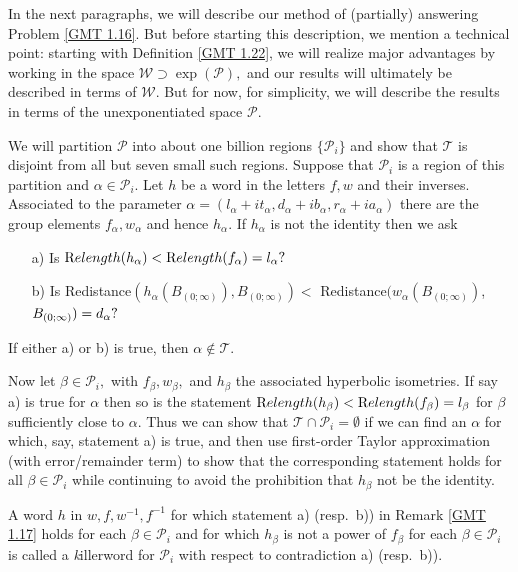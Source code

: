 \begin{remark}\label{GMT 1.17}
	In the next     paragraphs, we will describe our method of (partially) answering Problem \ref{GMT 1.16}.  But before starting this description, we
	mention a technical point: starting with Definition \ref{GMT 1.22}, we 
will realize major advantages by working in the space $\mathcal {W} \supset \exp(\mathcal {P}),$ and
our results will ultimately be described in terms of $\mathcal {W}.$ But for now, for simplicity,  we will describe the results in terms of the unexponentiated space $\mathcal {P}.$

We will partition $\mathcal {P}$ into about one billion regions
$\{ \mathcal {P}_i\}$ and show that $\mathcal {T}$ is disjoint from all but seven small such regions.   Suppose that
$\mathcal {P}_i$ is a region of this partition and $\alpha\in \mathcal {P}_i.$  Let $h$ be a word in the
letters $f,w$ and their inverses.  Associated to the parameter
$\alpha=(l_\alpha+it_\alpha, d_\alpha+ib_\alpha, r_\alpha
+ia_\alpha)$ there are the group elements
$f_\alpha, w_\alpha$ and hence $h_\alpha.$ 
If $h_\alpha$ is not the identity then we ask
\begin{itemize}
\item[a)]  Is ${\textrm Relength} (h_\alpha) < {\textrm Relength}(f_\alpha) = l_\alpha?$

\item[b)]  Is Redistance$(h_\alpha(B_{(0;\infty)}), B_{(0;\infty)}) < $ Redistance$(w_\alpha(B_{(0;\infty)})$, $B_{(0;\infty)})\break = d_\alpha?$
\end{itemize}
\noindent If either a) or b) is true, then $\alpha\notin \mathcal {T}.$

Now let $\beta\in \mathcal {P}_i,$
with $f_\beta, w_\beta,$ and $h_\beta$ the associated hyperbolic isometries.  If
say a) is true for $\alpha$
then so is the statement $\Relength(h_\beta) < \Relength(f_\beta)\break = l_\beta$ for
$\beta$ sufficiently close to $\alpha.$
Thus we can show that $\mathcal {T}\cap \mathcal {P}_i =\emptyset$ if we can find an $\alpha$ for
which, say, statement a) is true, and then
use first-order Taylor approximation (with error/remainder term) to show that the corresponding
statement holds for all $\beta\in \mathcal {P}_i $ while continuing to avoid the prohibition that $h_\beta$ not be the identity.
\end{remark}


\begin{definition}  \label{GMT 1.18} A word $h$ in $w,f,w^{-1},f^{-1}$ for which statement a) (resp.\ b)) in
Remark \ref{GMT 1.17}
holds for each $\beta\in \mathcal {P}_i$
and for which $h_\beta$ is not a power of $f_\beta$ for each $\beta\in \mathcal {P}_i$ is
called a {\textit killerword} for $\mathcal {P}_i$ with respect to contradiction a) (resp.\ b)).
\end{definition}

